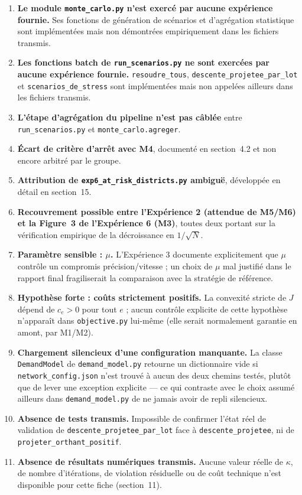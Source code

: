 \documentclass[11pt,a4paper]{article}
\begin{document}
\begin{enumerate}
  \item \textbf{Le module \texttt{monte\_carlo.py} n'est exercé par aucune
  expérience fournie.} Ses fonctions de génération de scénarios et
  d'agrégation statistique sont implémentées mais non démontrées
  empiriquement dans les fichiers transmis.
  \item \textbf{Les fonctions batch de \texttt{run\_scenarios.py} ne sont
  exercées par aucune expérience fournie.} \texttt{resoudre\_tous},
  \texttt{descente\_projetee\_par\_lot} et \texttt{scenarios\_de\_stress}
  sont implémentées mais non appelées ailleurs dans les fichiers transmis.
  \item \textbf{L'étape d'agrégation du pipeline n'est pas câblée} entre
  \texttt{run\_scenarios.py} et \texttt{monte\_carlo.agreger}.
  \item \textbf{Écart de critère d'arrêt avec M4}, documenté en section~4.2
  et non encore arbitré par le groupe.
  \item \textbf{Attribution de \texttt{exp6\_at\_risk\_districts.py}
  ambiguë}, développée en détail en section~15.
  \item \textbf{Recouvrement possible entre l'Expérience 2 (attendue de
  M5/M6) et la Figure~3 de l'Expérience 6 (M3)}, toutes deux portant sur la
  vérification empirique de la décroissance en $1/\sqrt{N}$.
  \item \textbf{Paramètre sensible : $\mu$.} L'Expérience 3 documente
  explicitement que $\mu$ contrôle un compromis précision/vitesse ; un choix
  de $\mu$ mal justifié dans le rapport final fragiliserait la comparaison
  avec la stratégie de référence.
  \item \textbf{Hypothèse forte : coûts strictement positifs.} La convexité
  stricte de $J$ dépend de $c_e > 0$ pour tout $e$ ; aucun contrôle
  explicite de cette hypothèse n'apparaît dans \texttt{objective.py} lui-même
  (elle serait normalement garantie en amont, par M1/M2).
  \item \textbf{Chargement silencieux d'une configuration manquante.} La
  classe \texttt{DemandModel} de \texttt{demand\_model.py} retourne un
  dictionnaire vide si \texttt{network\_config.json} n'est trouvé à aucun des
  deux chemins testés, plutôt que de lever une exception explicite --- ce qui
  contraste avec le choix assumé ailleurs dans \texttt{demand\_model.py} de
  ne jamais avoir de repli silencieux.
  \item \textbf{Absence de tests transmis.} Impossible de confirmer l'état
  réel de validation de \texttt{descente\_projetee\_par\_lot} face à
  \texttt{descente\_projetee}, ni de \texttt{projeter\_orthant\_positif}.
  \item \textbf{Absence de résultats numériques transmis.} Aucune valeur
  réelle de $\kappa$, de nombre d'itérations, de violation résiduelle ou de
  coût technique n'est disponible pour cette fiche (section~11).
\end{enumerate}
\end{document}
